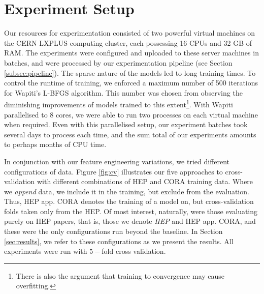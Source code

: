\section{Experiment Setup}
\label{sec:experimentsetup}

Our resources for experimentation consisted of two powerful virtual machines on the CERN LXPLUS computing cluster, each possessing 16 CPUs and 32 GB of RAM. The experiments were configured and uploaded to these server machines in batches, and were processed by our experimentation pipeline (see Section \ref{subsec:pipeline}). The sparse nature of the models led to long training times. To control the runtime of training, we enforced a maximum number of 500 iterations for Wapiti's L-BFGS algorithm. This number was chosen from observing the diminishing improvements of models trained to this extent\footnote{There is also the argument that training to convergence may cause overfitting.}. With Wapiti parallelised to 8 cores, we were able to run two processes on each virtual machine when required. Even with this parallelised setup, our experiment batches took several days to process each time, and the sum total of our experiments amounts to perhaps months of CPU time.

In conjunction with our feature engineering variations, we tried different configurations of data. Figure \ref{fig:cv} illustrates our five approaches to cross-validation with different combinations of HEP and CORA training data. Where we \emph{append} data, we include it in the training, but exclude from the evaluation. Thus, HEP app. CORA denotes the training of a model on, but cross-validation folds taken only from the HEP. Of most interest, naturally, were those evaluating purely on HEP papers, that is, those we denote \emph{HEP} and {HEP app. CORA}, and these were the only configurations run beyond the baseline. In Section \ref{sec:results}, we refer to these configurations as we present the results. All experiments were run with $5-$fold cross validation.

